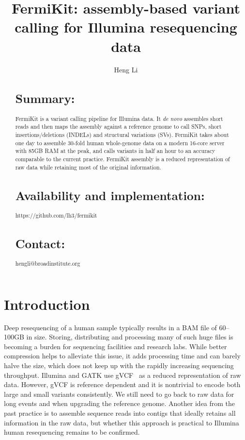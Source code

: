 \documentclass{bioinfo}
\begin{document}

\title[FermiKit: assembly based variant calling]{FermiKit: assembly-based variant calling for Illumina resequencing data}

\author[Li]{Heng Li}

\address{Broad Institute, 75 Ames Street, Cambridge, MA 02142, USA}

\maketitle

\begin{abstract}
\section{Summary:}
FermiKit is a variant calling pipeline for Illumina data. It {\it de novo}
assembles short reads and then maps the assembly against a reference genome to
call SNPs, short insertions/deletions (INDELs) and structural variations (SVs).
FermiKit takes about one day to assemble 30-fold human whole-genome data on a
modern 16-core server with 85GB RAM at the peak, and calls variants in half an hour to
an accuracy comparable to the current practice. FermiKit assembly is a reduced
representation of raw data while retaining most of the original information.

\section{Availability and implementation:} https://github.com/lh3/fermikit

\section{Contact:} hengli@broadinstitute.org
\end{abstract}

\section{Introduction}
Deep resequencing of a human sample typically results in a BAM file of
60--100GB in size. Storing, distributing and processing many of such huge files
is becoming a burden for sequencing facilities and research labs. While better
compression helps to alleviate this issue, it adds processing time and can
barely halve the size, which does not keep up with the rapidly increasing
sequencing throughput. Illumina and GATK use gVCF~\citep{Raczy:2013aa} as a
reduced representation of raw data. However, gVCF is reference dependent and it
is nontrivial to encode both large and small variants consistently. We still
need to go back to raw data for long events and when upgrading the reference
genome. Another idea from the past practice is to assemble sequence reads into
contigs that ideally retains all information in the raw data, but whether this
approach is practical to Illumina human resequencing remains to be confirmed.
\end{document}
